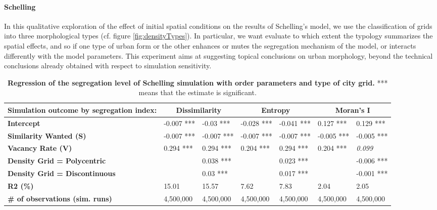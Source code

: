 \documentclass[Royal,sageh,times]{sagej}
\begin{document}

\paragraph{Schelling} In this qualitative exploration of the effect of initial spatial conditions on the results of Schelling's model, we use the classification of grids into three morphological types (cf. figure \ref{fig:densityTypes}). In particular, we want evaluate to which extent the typology summarizes the spatial effects, and so if one type of urban form or the other enhances or mutes the segregation mechanism of the model, or interacts differently with the model parameters. This experiment aims at suggesting topical conclusions on urban morphology, beyond the technical conclusions already obtained with respect to simulation sensitivity.

\begin{table}[htbp]
\caption{\textbf{Regression of the segregation level of Schelling simulation with order parameters and type of city grid.} *** means that the estimate is significant.\label{tab:regressionSchelling}}
\begin{adjustwidth}{-0.5cm}{-0.5cm}
\centering
\begin{tabular}{|m{2cm}|ll|ll|ll|}
\hline
Simulation outcome by segregation index: & \multicolumn{2}{c|}{\textbf{Dissimilarity}} & \multicolumn{2}{c|}{\textbf{Entropy}} & \multicolumn{2}{c|}{\textbf{Moran's I}} \\ \hline
\textbf{Intercept}                       & -0.007 ***  & -0.03 ***                     & -0.028 ***        & -0.041 ***        & 0.127 ***        & 0.129 ***            \\ \hline
\textbf{Similarity Wanted (S)}           & -0.007 ***  & -0.007 ***                    & -0.007 ***        & -0.007 ***        & -0.005 ***       & -0.005 ***           \\ 
\textbf{Vacancy Rate (V)}                & 0.294 ***   & 0.294 ***                     & 0.204 ***         & 0.294 ***         & 0.204 ***        & \textit{0.099}       \\ \hline
\textbf{Density Grid = Polycentric}      &             & 0.038 ***                     &                   & 0.023 ***         &                  & -0.006 ***           \\ 
\textbf{Density Grid = Discontinuous}    &             & 0.03 ***                     &                   & 0.017 ***         &                  & -0.001 ***           \\ \hline
\textbf{R2 (\%)}                         & 15.01       & 15.57  & 7.62              & 7.83              & 2.04             & 2.05                 \\ 
\textbf{\# of observations (sim. runs)}  & 4,500,000   & 4,500,000                     & 4,500,000         & 4,500,000         & 4,500,000        & 4,500,000            \\ \hline
\end{tabular}
\end{adjustwidth}
\end{table}
\end{document}
